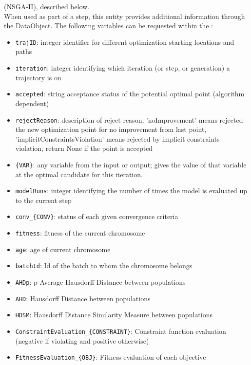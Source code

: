   (NSGA-II), described below.
\vspace{7pt} \\When used as part of a  step, this entity provides
        additional information through the  DataObject. The
        following variables can be requested within the :
        \begin{itemize}
          \item \texttt{trajID}: integer identifier for different optimization starting locations and paths
             \item \texttt{iteration}: integer identifying which iteration (or step, or generation) a trajectory is on
             \item \texttt{accepted}: string acceptance status of the potential optimal point (algorithm dependent)
             \item \texttt{rejectReason}: description of reject reason, 'noImprovement' means rejected the new optimization point for no improvement from last point, 'implicitConstraintsViolation' means rejected by implicit constraints violation, return None if the point is accepted
             \item \texttt{\{VAR\}}: any variable from the  input or output; gives the value of that variable at the optimal candidate for this iteration.
             \item \texttt{modelRuns}: integer identifying the number of times the model is evaluated up to the current step
             \item \texttt{conv\_\{CONV\}}: status of each given convergence criteria
             \item \texttt{fitness}: fitness of the current chromosome
             \item \texttt{age}: age of current chromosome
             \item \texttt{batchId}: Id of the batch to whom the chromosome belongs
             \item \texttt{AHDp}: p-Average Hausdorff Distance between populations
             \item \texttt{AHD}: Hausdorff Distance between populations
             \item \texttt{HDSM}: Hausdorff Distance Similarity Measure between populations
             \item \texttt{ConstraintEvaluation\_\{CONSTRAINT\}}: Constraint function evaluation (negative if violating and positive otherwise)
             \item \texttt{FitnessEvaluation\_\{OBJ\}}: Fitness evaluation of each objective

         \end{itemize}

